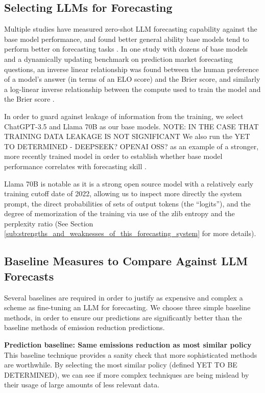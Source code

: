\documentclass[12pt,a4paper]{article}
\begin{document}
\subsection{Selecting LLMs for Forecasting \DOMAINCAPITALIZEDINTERVENTIONTWO}
Multiple studies have measured zero-shot LLM forecasting capability against the base model performance, and found better general ability base models tend to perform better on forecasting tasks  . In one study with dozens of base models and a dynamically updating benchmark on prediction market forecasting questions, an inverse linear relationship was found between the human preference of a model's answer (in terms of an ELO score) and the Brier score, and similarly a log-linear inverse relationship between the compute used to train the model and the Brier score .

In order to guard against leakage of information from the training, we select ChatGPT-3.5 and Llama 70B  as our base models. NOTE: IN THE CASE THAT TRAINING DATA LEAKAGE IS NOT SIGNIFICANT We also run the YET TO DETERMINED - DEEPSEEK? OPENAI OSS? as an example of a stronger, more recently trained model in order to establish whether base model performance correlates with forecasting skill \ABSTRACT. 

Llama 70B is notable as it is a strong open source model with a relatively early training cutoff date of 2022, allowing us to inspect more directly the system prompt, the direct probabilities of sets of output tokens (the ``logits''), and the degree of memorization of the training via use of the zlib entropy and the perplexity ratio (See Section \ref{sub:strengths_and_weaknesses_of_this_forecasting_system} for more details).

\subsection{Baseline Measures to Compare Against LLM Forecasts}
Several baselines are required in order to justify as expensive and complex a scheme as fine-tuning an LLM for forecasting. We choose three simple baseline methods, in order to ensure our predictions are significantly better than the baseline methods of emission reduction predictions.

\textbf{Prediction baseline: Same emissions reduction as most similar policy}
This baseline technique provides a sanity check that more sophisticated methods are worthwhile. By selecting the most similar policy (defined YET TO BE DETERMINED), we can see if more complex techniques are being mislead by their usage of large amounts of less relevant data.
\end{document}
